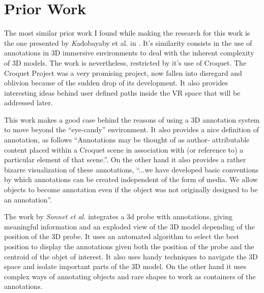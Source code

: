 \section{Prior Work}
The most similar prior work I found while making the research for this work is the one presented by {\emph Kadobayaby et al.} in \cite{Kadobayashi}. It's similarity consists in the use of annotations in 3D immersive environments to deal with the inherent complexity of 3D models. The work is nevertheless, restricted by it's use of Croquet. The Croquet Project was a very promising project, now fallen into disregard and oblivion because of the sudden drop of its development. It also provides interesting ideas behind user defined paths inside the VR space that will be addressed later.

This work makes a good case behind the reasons of using a 3D annotation system to move beyond the ``eye-candy'' environment. It also provides a nice definition of annotation, as follows ``Annotations may be thought of as author- attributable content placed within a Croquet scene in association with (or reference to) a particular element of that scene.''. On the other hand it also provides a rather bizarre visualization of these annotations, ``...we have developed basic conventions by which annotations can be created independent of the form of media. We allow objects to become annotation even if the object was not originally designed to be an annotation''. 

The work by {\em Sonnet et al.} \cite{Sonnet} integrates a 3d probe with annotations, giving meaningful information and an exploded view of the 3D model depending of the position of the 3D probe. It uses an automated algorithm to select the best position to display the annotations given both the position of the probe and the centroid of the objet of interest. It also uses handy techniques to navigate the 3D space and isolate important parts of the 3D model. On the other hand it uses complex ways of annotating objects and rare shapes to work as containers of the annotations.

